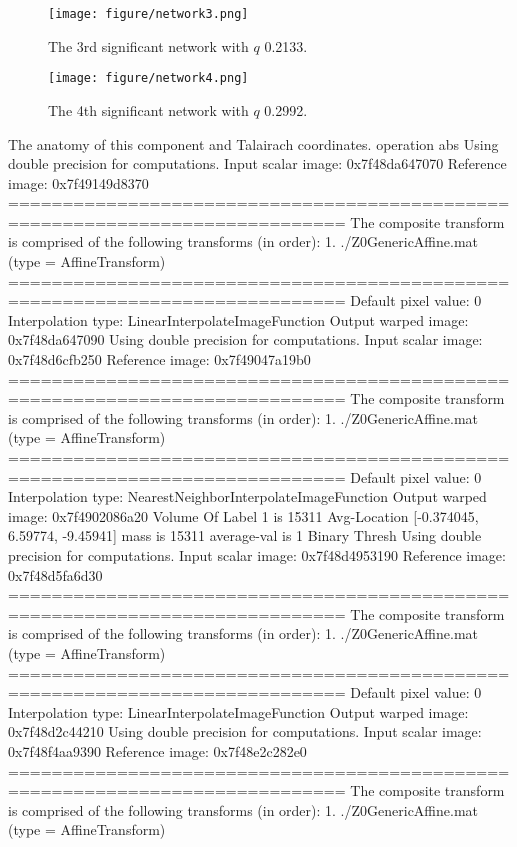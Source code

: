 \documentclass{elsarticle}\usepackage{graphicx, color}
\begin{document}
 
\begin{figure}[h]
  \centering
    \texttt{[image: figure/network3.png]}
  \caption{The 3rd significant network with $q$ 0.2133.}
\end{figure}

\begin{figure}[h]
  \centering
    \texttt{[image: figure/network4.png]}
  \caption{The 4th significant network with $q$ 0.2992.}
\end{figure}



The anatomy of this component and Talairach coordinates.
operation abs
Using double precision for computations.
Input scalar image: 0x7f48da647070
Reference image: 0x7f49149d8370
=============================================================================
The composite transform is comprised of the following transforms (in order): 
  1. ./Z0GenericAffine.mat (type = AffineTransform)
=============================================================================
Default pixel value: 0
Interpolation type: LinearInterpolateImageFunction
Output warped image: 0x7f48da647090
Using double precision for computations.
Input scalar image: 0x7f48d6cfb250
Reference image: 0x7f49047a19b0
=============================================================================
The composite transform is comprised of the following transforms (in order): 
  1. ./Z0GenericAffine.mat (type = AffineTransform)
=============================================================================
Default pixel value: 0
Interpolation type: NearestNeighborInterpolateImageFunction
Output warped image: 0x7f4902086a20
 Volume Of Label 1 is 15311  Avg-Location [-0.374045, 6.59774, -9.45941] mass is 15311 average-val is 1
 Binary Thresh 
Using double precision for computations.
Input scalar image: 0x7f48d4953190
Reference image: 0x7f48d5fa6d30
=============================================================================
The composite transform is comprised of the following transforms (in order): 
  1. ./Z0GenericAffine.mat (type = AffineTransform)
=============================================================================
Default pixel value: 0
Interpolation type: LinearInterpolateImageFunction
Output warped image: 0x7f48d2c44210
Using double precision for computations.
Input scalar image: 0x7f48f4aa9390
Reference image: 0x7f48e2c282e0
=============================================================================
The composite transform is comprised of the following transforms (in order): 
  1. ./Z0GenericAffine.mat (type = AffineTransform)
\end{document}
